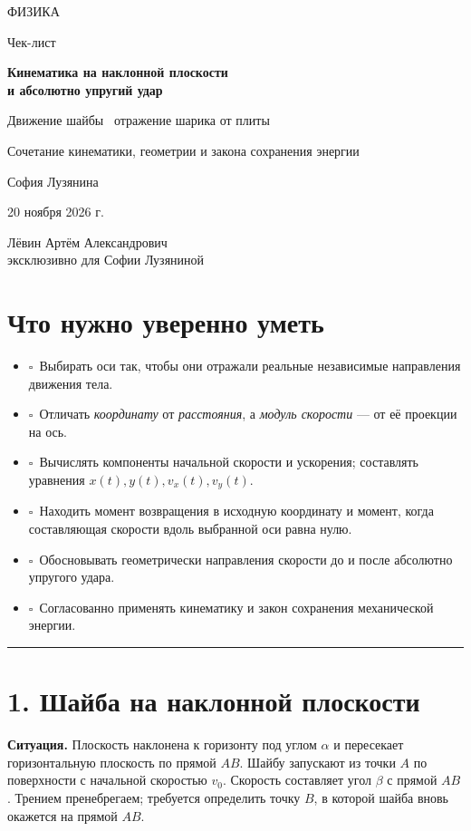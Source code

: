 \documentclass[a4paper,12pt]{article}
\newcommand{\checkit}{\(\square\)}
\newcommand{\separate}{\par\vspace{0.25em}\noindent\color{accent}\rule{\linewidth}{0.5pt}\color{black}\par\vspace{0.25em}}
\newcommand{\secstyle}[1]{\section*{\textcolor{darkaccent}{#1}}}
\begin{document}
\thispagestyle{empty}
\begin{center}
\vspace*{23mm}
{\large\color{darkaccent}\MakeUppercase{Физика}}\par
\vspace{18mm}
{\LARGE Чек-лист}\par
\vspace{9mm}
{\LARGE\color{accent}\bfseries Кинематика на наклонной плоскости\\[5pt]и абсолютно упругий удар}\par
\vspace{14mm}
{\large Движение шайбы \textperiodcentered\ отражение шарика от плиты}\par
{\normalsize Сочетание кинематики, геометрии и закона сохранения энергии}\par
\vfill
{\large София Лузянина}\par
\vspace{10mm}
{\large 20 ноября 2026 г.}\par
\vspace{13mm}
{\small Лёвин Артём Александрович}\\[4pt]
{\small эксклюзивно для Софии Лузяниной}\par
\vspace{22mm}
\end{center}
\clearpage

\secstyle{Что нужно уверенно уметь}
\begin{itemize}[label={}]
\item \checkit\ Выбирать оси так, чтобы они отражали реальные независимые направления движения тела.
\item \checkit\ Отличать \emph{координату} от \emph{расстояния}, а \emph{модуль скорости} --- от её проекции на ось.
\item \checkit\ Вычислять компоненты начальной скорости и ускорения; составлять уравнения \(x(t),y(t),v_x(t),v_y(t)\).
\item \checkit\ Находить момент возвращения в исходную координату и момент, когда составляющая скорости вдоль выбранной оси равна нулю.
\item \checkit\ Обосновывать геометрически направления скорости до и после абсолютно упругого удара.
\item \checkit\ Согласованно применять кинематику и закон сохранения механической энергии.
\end{itemize}
\separate
\secstyle{1. Шайба на наклонной плоскости}
\textbf{Ситуация.} Плоскость наклонена к горизонту под углом \(\alpha\) и пересекает горизонтальную плоскость по прямой \(AB\). Шайбу запускают из точки \(A\) по поверхности с начальной скоростью \(v_0\). Скорость составляет угол \(\beta\) с прямой \(AB\). Трением пренебрегаем; требуется определить точку \(B\), в которой шайба вновь окажется на прямой \(AB\).
\end{document}
